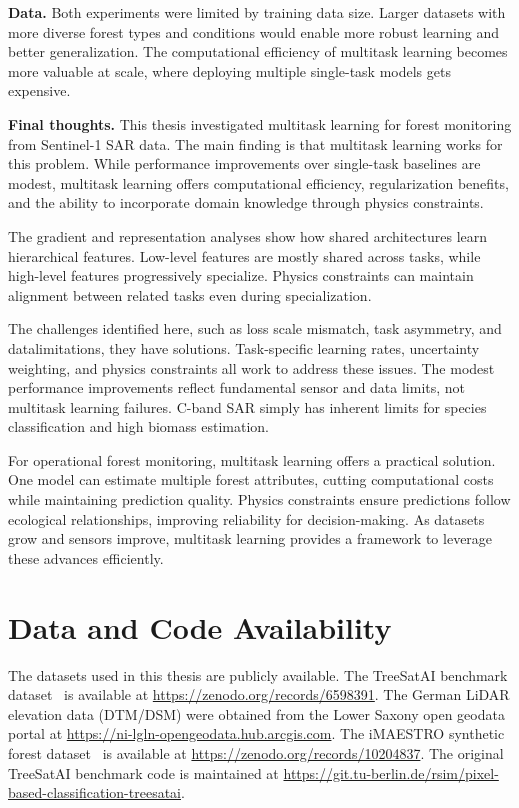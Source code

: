 \textbf{Data.} Both experiments were limited by training data size. Larger datasets with more diverse forest types and conditions would enable more robust learning and better generalization. The computational efficiency of multitask learning becomes more valuable at scale, where deploying multiple single-task models gets expensive.

\textbf{Final thoughts.} This thesis investigated multitask learning for forest monitoring from Sentinel-1 SAR data. The main finding is that multitask learning works for this problem. While performance improvements over single-task baselines are modest, multitask learning offers computational efficiency, regularization benefits, and the ability to incorporate domain knowledge through physics constraints.

The gradient and representation analyses show how shared architectures learn hierarchical features. Low-level features are mostly shared across tasks, while high-level features progressively specialize. Physics constraints can maintain alignment between related tasks even during specialization.

The challenges identified here, such as loss scale mismatch, task asymmetry, and datalimitations, they have solutions. Task-specific learning rates, uncertainty weighting, and physics constraints all work to address these issues. The modest performance improvements reflect fundamental sensor and data limits, not multitask learning failures. C-band SAR simply has inherent limits for species classification and high biomass estimation.

For operational forest monitoring, multitask learning offers a practical solution. One model can estimate multiple forest attributes, cutting computational costs while maintaining prediction quality. Physics constraints ensure predictions follow ecological relationships, improving reliability for decision-making. As datasets grow and sensors improve, multitask learning provides a framework to leverage these advances efficiently.

\section*{Data and Code Availability}

The datasets used in this thesis are publicly available. The TreeSatAI benchmark dataset~\citep{ahlswede_treesatai_2023} is available at \url{https://zenodo.org/records/6598391}. The German LiDAR elevation data (DTM/DSM) were obtained from the Lower Saxony open geodata portal at \url{https://ni-lgln-opengeodata.hub.arcgis.com}. The iMAESTRO synthetic forest dataset~\citep{aussenac_diameter_2023} is available at \url{https://zenodo.org/records/10204837}. The original TreeSatAI benchmark code is maintained at \url{https://git.tu-berlin.de/rsim/pixel-based-classification-treesatai}.


